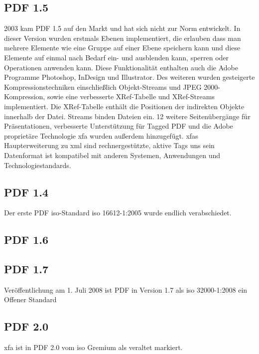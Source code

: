 \subsection{PDF 1.5}
2003 kam PDF 1.5 auf den Markt und hat sich nicht zur Norm entwickelt. In dieser Version wurden erstmals Ebenen implementiert, die erlauben dass man mehrere Elemente wie eine Gruppe auf einer Ebene speichern kann und diese Elemente auf einmal nach Bedarf ein- und ausblenden kann, sperren oder Operationen anwenden kann. Diese Funktionalität enthalten auch die Adobe Programme Photoshop, InDesign und Illustrator. Des weiteren wurden gesteigerte Kompressionstechniken einschließlich Objekt-Streams und JPEG 2000-Kompression, sowie eine verbesserte XRef-Tabelle und XRef-Streams implementiert.
Die XRef-Tabelle enthält die Positionen der indirekten Objekte innerhalb der Datei. Streams binden Dateien ein. 12 weitere Seitenübergänge für Präsentationen, verbesserte Unterstützung für Tagged PDF und die Adobe proprietäre Technologie \gls{xfa} wurden außerdem hinzugefügt. \cite{proj-consult} \gls{xfa}s Haupterweiterung zu \gls{xml} sind rechnergestützte, aktive Tags uns sein Datenformat ist kompatibel mit anderen Systemen, Anwendungen und Technologiestandards. \cite{wiki-xfa}

\subsection{PDF 1.4}
Der erste PDF \gls{iso}-Standard \gls{iso} 16612-1:2005 wurde endlich verabschiedet.

\subsection{PDF 1.6}

\subsection{PDF 1.7}
Veröffentlichung am 1. Juli 2008 ist PDF in Version 1.7 als \gls{iso} 32000-1:2008 ein Offener Standard

\subsection{PDF 2.0}
\gls{xfa} ist in PDF 2.0 vom \gls{iso} Gremium als veraltet markiert.